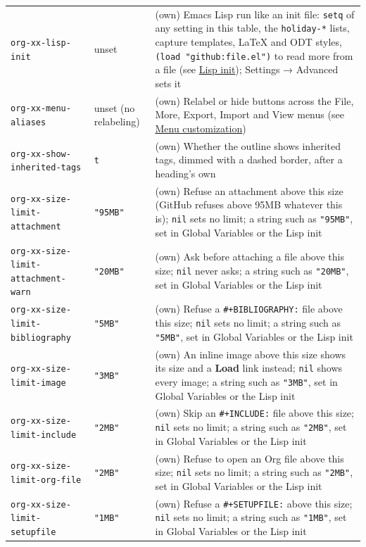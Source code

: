\documentclass[11pt]{article}
\begin{document}
\begin{center}
\begin{tabular}{lll}
\texttt{org-xx-lisp-init} & unset & (own) Emacs Lisp run like an init file: \texttt{setq} of any setting in this table, the \texttt{holiday-*} lists, capture templates, \LaTeX{} and ODT styles, \texttt{(load "github:file.el")} to read more from a file (see \hyperref[sec:orgfd04167]{Lisp init}); Settings → Advanced sets it\\[0pt]
\texttt{org-xx-menu-aliases} & unset (no relabeling) & (own) Relabel or hide buttons across the File, More, Export, Import and View menus (see \hyperref[sec:orgc0b0953]{Menu customization})\\[0pt]
\texttt{org-xx-show-inherited-tags} & \texttt{t} & (own) Whether the outline shows inherited tags, dimmed with a dashed border, after a heading's own\\[0pt]
\texttt{org-xx-size-limit-attachment} & \texttt{"95MB"} & (own) Refuse an attachment above this size (GitHub refuses above 95MB whatever this is); \texttt{nil} sets no limit; a string such as \texttt{"95MB"}, set in Global Variables or the Lisp init\\[0pt]
\texttt{org-xx-size-limit-attachment-warn} & \texttt{"20MB"} & (own) Ask before attaching a file above this size; \texttt{nil} never asks; a string such as \texttt{"20MB"}, set in Global Variables or the Lisp init\\[0pt]
\texttt{org-xx-size-limit-bibliography} & \texttt{"5MB"} & (own) Refuse a \texttt{\#+BIBLIOGRAPHY:} file above this size; \texttt{nil} sets no limit; a string such as \texttt{"5MB"}, set in Global Variables or the Lisp init\\[0pt]
\texttt{org-xx-size-limit-image} & \texttt{"3MB"} & (own) An inline image above this size shows its size and a \textbf{Load} link instead; \texttt{nil} shows every image; a string such as \texttt{"3MB"}, set in Global Variables or the Lisp init\\[0pt]
\texttt{org-xx-size-limit-include} & \texttt{"2MB"} & (own) Skip an \texttt{\#+INCLUDE:} file above this size; \texttt{nil} sets no limit; a string such as \texttt{"2MB"}, set in Global Variables or the Lisp init\\[0pt]
\texttt{org-xx-size-limit-org-file} & \texttt{"2MB"} & (own) Refuse to open an Org file above this size; \texttt{nil} sets no limit; a string such as \texttt{"2MB"}, set in Global Variables or the Lisp init\\[0pt]
\texttt{org-xx-size-limit-setupfile} & \texttt{"1MB"} & (own) Refuse a \texttt{\#+SETUPFILE:} above this size; \texttt{nil} sets no limit; a string such as \texttt{"1MB"}, set in Global Variables or the Lisp init\\[0pt]

\end{tabular}
\end{center}
\end{document}
